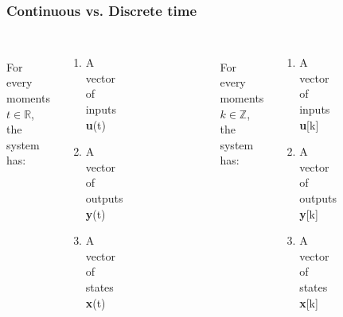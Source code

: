 \documentclass{beamer}
\begin{document}
\begin{frame}
\frametitle{Continuous vs. Discrete time}
\vspace{-2ex}
\begin{columns}[c] 

\\
For every moments $t \in \mathds{R}$, the system has: 
\begin{enumerate}
\item A vector of inputs \textbf{u}(t)
\item A vector of outputs \textbf{y}(t)
\item A vector of states \textbf{x}(t)
\end{enumerate}
\begin{figure}
\includegraphics[width=0.8\linewidth]{continuous}
\end{figure}

\\
For every moments $k \in \mathds{Z}$, the system has: 
\begin{enumerate}
\item A vector of inputs \textbf{u}[k]
\item A vector of outputs \textbf{y}[k]
\item A vector of states \textbf{x}[k]
\end{enumerate}
\begin{figure}
\includegraphics[width=0.8\linewidth]{discrete}
\end{figure}

\end{columns}
\end{frame}
\end{document}
